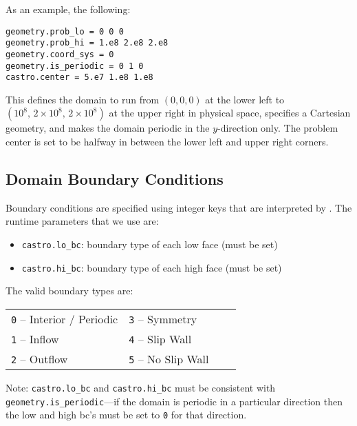 As an example, the following:
\begin{lstlisting}
geometry.prob_lo = 0 0 0
geometry.prob_hi = 1.e8 2.e8 2.e8 
geometry.coord_sys = 0 
geometry.is_periodic = 0 1 0 
castro.center = 5.e7 1.e8 1.e8
\end{lstlisting}

This defines the domain to run from $(0,0,0)$ at the lower left to
$(10^8,\, 2\times 10^8,\, 2\times 10^8)$ at the upper right in physical
space, specifies a Cartesian geometry, and makes the domain periodic
in the $y$-direction only. The problem center is set to be halfway in
between the lower left and upper right corners.


\subsection{Domain Boundary Conditions}

Boundary conditions are specified using integer keys that are interpreted
by \boxlib.  The runtime parameters that we use are:
\begin{itemize}
\item {\tt castro.lo\_bc}: boundary type of each low face  (must be set)
\item {\tt castro.hi\_bc}: boundary type of each high face (must be set)
\end{itemize}

The valid boundary types are:
\begin{table*}[h]
\begin{center}
\begin{tabular}{llll} 
{\tt 0} --  Interior / Periodic \hspace{1.in} & {\tt 3}  --  Symmetry     \hspace{1.in} & \\
{\tt 1} --  Inflow              \hspace{1.in} & {\tt 4}  --  Slip Wall    \hspace{1.in}& \\
{\tt 2} --  Outflow             \hspace{1.in} & {\tt 5}  --  No Slip Wall \hspace{1.in}& \\
\end{tabular}
\end{center}
\end{table*}

\noindent Note: {\tt castro.lo\_bc} and {\tt castro.hi\_bc} must be
consistent with {\tt geometry.is\_periodic}---if the domain is
periodic in a particular direction then the low and high bc's must be
set to {\tt 0} for that direction.

